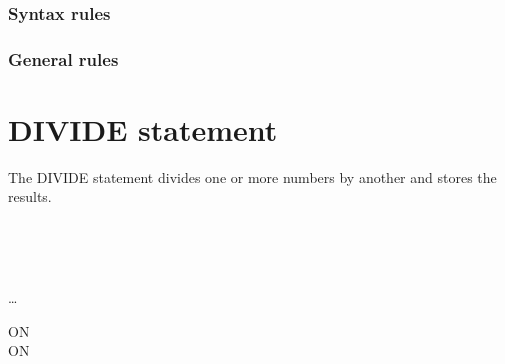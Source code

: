 \subsubsection{Syntax rules}

\subsubsection{General rules}

\section{DIVIDE statement}

The DIVIDE statement divides one or more numbers by another and stores the results.

\begin{syntax}
  \begin{1=}
    \identifier \\
    \literal
  \end{1=}
  \begin{1=}
    \begin{1=}
      \identifier \\
      \literal
    \end{1=}
    \begin{0-1}
    \end{0-1}
  \end{1=} \ldots

  \begin{0+}
    ON   \imperativestatement \\
     ON   \imperativestatement
  \end{0+}

  \begin{0-1}
  \end{0-1}
\end{syntax}

